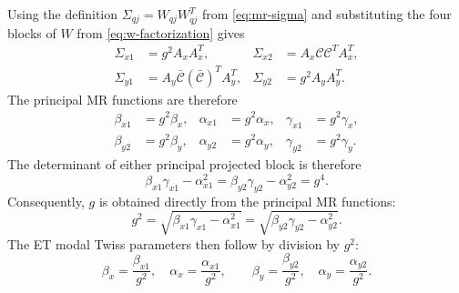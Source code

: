 \documentclass[11pt,a4paper]{article}
\begin{document}
Using the definition $\Sigma_{qj}=W_{qj}W_{qj}^T$ from
\cref{eq:mr-sigma} and substituting the four blocks of $W$ from
\cref{eq:w-factorization} gives
\begin{align}
 \Sigma_{x1}&=g^2 A_xA_x^T,
 &\Sigma_{x2}&=A_x\mathcal C\mathcal C^TA_x^T,
 \label{eq:sigmax-factorization}\\
 \Sigma_{y1}&=A_y\bar{\mathcal C}(\bar{\mathcal C})^TA_y^T,
 &\Sigma_{y2}&=g^2 A_yA_y^T.
 \label{eq:sigmay-factorization}
\end{align}
The principal MR functions are therefore
\begin{align}
 \beta_{x1}&=g^2\beta_x,
 &\alpha_{x1}&=g^2\alpha_x,
 &\gamma_{x1}&=g^2\gamma_x,
 \label{eq:mr-et-main-x}\\
 \beta_{y2}&=g^2\beta_y,
 &\alpha_{y2}&=g^2\alpha_y,
 &\gamma_{y2}&=g^2\gamma_y.
 \label{eq:mr-et-main-y}
\end{align}
The determinant of either principal projected block is therefore
\begin{equation}
 \beta_{x1}\gamma_{x1}-\alpha_{x1}^2
 =\beta_{y2}\gamma_{y2}-\alpha_{y2}^2
 =g^4.
 \label{eq:main-determinants}
\end{equation}
Consequently, $g$ is obtained directly from the principal MR functions:
\begin{equation}
 \boxed{
 g^2
 =\sqrt{\beta_{x1}\gamma_{x1}-\alpha_{x1}^2}
 =\sqrt{\beta_{y2}\gamma_{y2}-\alpha_{y2}^2}.
 }
 \label{eq:g-from-mr}
\end{equation}
The ET modal Twiss parameters then follow by division by $g^2$:
\begin{equation}
 \boxed{
 \beta_x=\frac{\beta_{x1}}{g^2},\quad
 \alpha_x=\frac{\alpha_{x1}}{g^2},\qquad
 \beta_y=\frac{\beta_{y2}}{g^2},\quad
 \alpha_y=\frac{\alpha_{y2}}{g^2}.
 }
 \label{eq:et-from-main-mr}
\end{equation}
\end{document}
